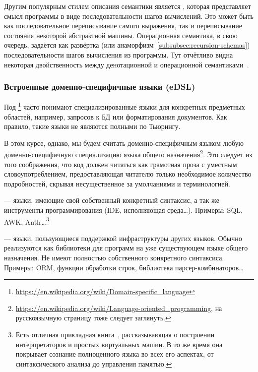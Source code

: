Другим популярным стилем описания семантики является , которая представляет смысл программы в виде последовательности шагов вычислений.
Это может быть как последовательное переписывание самого выражения, так и переписывание состояния некоторой абстрактной машины.
Операционная семантика, в свою очередь, задаётся как развёртка (или анаморфизм~\ref{subsubsec:recursion-schemas}) последовательности шагов вычисления из программы.
Тут отчётливо видна некоторая двойственность между денотационной и операционной семантиками~\cite{hutton1998fold}.

\subsubsection{Встроенные доменно-специфичные языки (eDSL)} \label{subsubsec:edsl}

Под \footnote{\url{https://en.wikipedia.org/wiki/Domain-specific_language}} часто понимают специализированные языки для конкретных предметных областей, например, запросов к БД или форматирования документов.
Как правило, такие языки не являются полными по Тьюрингу.

В этом курсе, однако, мы будем считать доменно-специфичным языком любую доменно-специфичную специализацию языка общего назначения\footnote{\url{https://en.wikipedia.org/wiki/Language-oriented_programming}, на русскоязычную страницу тоже следует заглянуть.}.
Это следует из того соображения, что код должен читаться как грамотная проза с уместным словоупотреблением, предоставляющая читателю только необходимое количество подробностей, скрывая несущественное за умолчаниями и терминологией.

 --- языки, имеющие свой собственный конкретный синтаксис, а так же инструменты программирования (IDE, исполняющая среда\ldots).
Примеры: SQL, AWK, Antlr\ldots\footnote{Есть отличная прикладная книга~\cite{nystrom2021crafting}, рассказывающая о построении интерпретаторов и простых виртуальных машин.
В то же время она покрывает сознание полноценного языка во всех его аспектах, от синтаксического анализа до управления памятью.}

 --- языки, пользующиеся поддержкой инфраструктуры других языков.
Обычно реализуются как библиотеки для программ на уже существующем языке общего назначения.
Не имеют полностью собственного конкретного синтаксиса.
Примеры: ORM, функции обработки строк, библиотека парсер-комбинаторов\ldots


